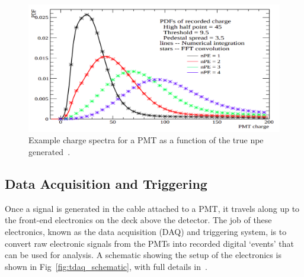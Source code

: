 \begin{figure}
    \centering
    \includegraphics[width=0.8\linewidth]{2_Detector/Figs/charge_spectra.png}
    \caption[Example charge spectra for a PMT as a function of the true npe generated]{Example charge spectra for a PMT as a function of the true npe generated~\cite{}. %
    }
    \label{fig:charge_dists_pmt}
\end{figure}


\subsection{Data Acquisition and Triggering}\label{sec:daq}
Once a signal is generated in the cable attached to a PMT, it travels along up to the front-end electronics on the deck above the detector. The job of these electronics, known as the data acquisition (DAQ) and triggering system, is to convert raw electronic signals from the PMTs into recorded digital `events' that can be used for analysis. A schematic showing the setup of the electronics is shown in Fig~\ref{fig:tdaq_schematic}, with full details in~\cite{albaneseSNOExperiment2021}. %

